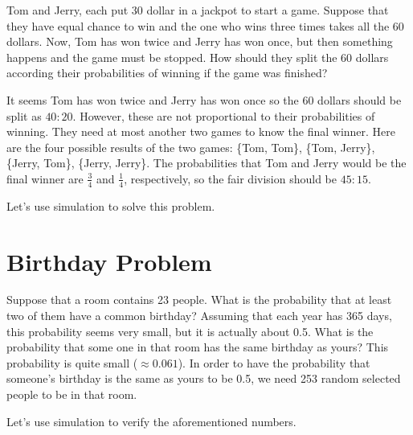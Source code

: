 \begin{example}
Tom and Jerry, each put 30 dollar in a jackpot to start a game. Suppose that
they have equal chance to win and the one who wins three times takes all the 60
dollars. Now, Tom has won twice and Jerry has won once, but then something
happens and the game must be stopped. How should they split the 60 dollars
according their probabilities of winning if the game was finished?
\end{example}

It seems Tom has won twice and Jerry has won once so the 60 dollars should be
split as $40:20$. However, these are not proportional to their probabilities of
winning. They need at most another two games to know the final winner. Here are
the four possible results of the two games: \{Tom, Tom\}, \{Tom, Jerry\},
\{Jerry, Tom\}, \{Jerry, Jerry\}. The probabilities that Tom and Jerry would be the final winner are $\frac{3}{4}$ and $\frac{1}{4}$, respectively, so the fair division should be $45:15$.

Let's use simulation to solve this problem.




\hypertarget{birthday-problem}{%
  \section{Birthday Problem}\label{birthday-problem}}

\begin{example}
Suppose that a room contains 23 people. What is the probability that
at least two of them have a common birthday? Assuming that each year has 365
days, this probability seems very small, but it is actually about
0.5. What is the probability that some one in that room has the same
birthday as yours? This probability is quite small
($\approx0.061$). In order to have the probability that someone's
birthday is the same as yours to be 0.5, we need 253 random selected people to
be in that room.
\end{example}

Let's use simulation to verify the aforementioned numbers.




